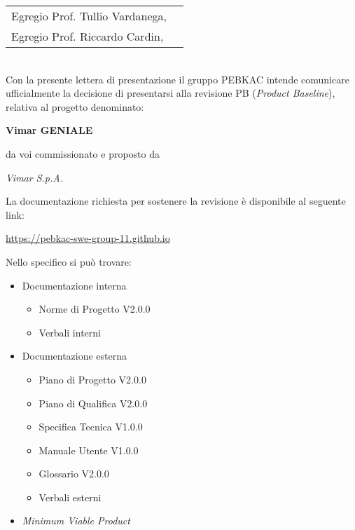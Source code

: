 \documentclass[12pt, a4paper]{article}
\begin{document}

\begin{tabular}{@{}l l@{}}
  Egregio Prof. Tullio Vardanega, &  \\Egregio Prof. Riccardo Cardin,
\end{tabular}
\\

Con la presente lettera di presentazione il gruppo PEBKAC intende comunicare ufficialmente la decisione di presentarsi alla revisione PB (\textit{Product Baseline}), relativa al progetto denominato:

{\huge\begin{center}\textbf{Vimar GENIALE}\end{center}}

da voi commissionato e proposto da 
{\begin{center}\textit{Vimar S.p.A.}\end{center}}

La documentazione richiesta per sostenere la revisione è disponibile al seguente link:

\begin{center}
\href{https://pebkac-swe-group-11.github.io}{https://pebkac-swe-group-11.github.io}
\end{center}

\newpage
Nello specifico si può trovare:
\begin{itemize}
    \item Documentazione interna
    \begin{itemize}
        \item Norme di Progetto V2.0.0
        \item Verbali interni            
    \end{itemize}
    \item Documentazione esterna
    \begin{itemize}
        \item Piano di Progetto V2.0.0
        \item Piano di Qualifica V2.0.0
        \item Specifica Tecnica V1.0.0
        \item Manuale Utente V1.0.0
        \item Glossario V2.0.0
        \item Verbali esterni            
    \end{itemize}
    \item \textit{Minimum Viable Product}
\end{itemize}
\end{document}
